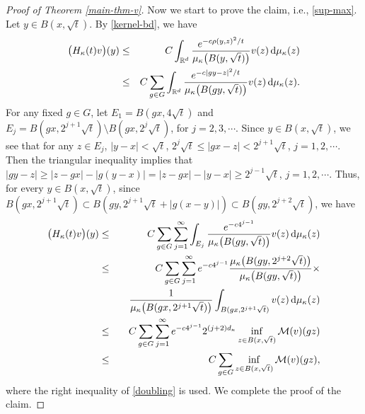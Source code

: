 \documentclass[11pt,a4paper]{article}
\def\R{\mathbb{R}}
\def\d{\textup{d}}
\theoremstyle{definition}\newtheorem{remark}[theorem]{Remark}
\begin{document}
\begin{proof}[Proof of Theorem \ref{main-thm-v}]
Now we start to prove the claim, i.e., \eqref{sup-max}. Let $y\in B(x,\sqrt{t})$. By \eqref{kernel-bd}, we have
\begin{eqnarray*}
\big(H_\kappa(t)v\big)(y)&\leq& C\int_{\R^d}\frac{e^{-c\rho(y,z)^2/t}}{\mu_\kappa\big(B(y,\sqrt{t})\big)}v(z)\,\d\mu_\kappa(z)\\
&\leq& C\sum_{g\in G}\int_{\R^d}\frac{e^{-c|gy-z|^2/t}}{\mu_\kappa\big(B(gy,\sqrt{t})\big)}v(z)\,\d\mu_\kappa(z).
\end{eqnarray*}
For any fixed $g\in G$, let $E_1=B(gx,4\sqrt{t})$ and $E_j=B(gx,2^{j+1}\sqrt{t})\setminus  B(gx,2^j\sqrt{t})$, for $j=2,3,\cdots$. Since $y\in B (x,\sqrt{t})$, we see that for any $z\in E_j$, $|y-x|<\sqrt{t}$, $2^j\sqrt{t}\leq|gx-z|<2^{j+1}\sqrt{t}$, $j=1,2,\cdots$. Then the triangular inequality implies that $|gy-z|\geq|z-gx|-|g(y-x)|=|z-gx|-|y-x|\geq 2^{j-1}\sqrt{t}$, $j=1,2,\cdots$. Thus, for every $y\in B(x,\sqrt{t})$, since $B(gx,2^{j+1}\sqrt{t})\subset B(gy,2^{j+1}\sqrt{t}+|g(x-y)|)\subset B(gy,2^{j+2}\sqrt{t})$, we have
\begin{eqnarray*}
\big(H_\kappa(t)v\big)(y)&\leq& C\sum_{g\in G}\sum_{j=1}^\infty
\int_{E_j}\frac{e^{-c4^{j-1}}}{\mu_\kappa\big(B(gy,\sqrt{t})\big)}v(z)\,\d\mu_\kappa(z)\\
&\leq&C\sum_{g\in G}\sum_{j=1}^\infty e^{-c4^{j-1}}\frac{\mu_\kappa\big(B(gy,2^{j+2}\sqrt{t})\big)}{\mu_\kappa\big(B(gy,\sqrt{t})\big)}\times\\
&&\quad\frac{1}{\mu_\kappa\big(B(gx,2^{j+1}\sqrt{t})\big)}\int_{B(gx,2^{j+1}\sqrt{t})}v(z)\,\d\mu_\kappa(z)\\
&\leq& C\sum_{g\in G}\sum_{j=1}^\infty e^{-c4^{j-1}}  2^{(j+2)d_\kappa}\inf_{z\in B(x,\sqrt{t})}\mathcal{M}(v)(g z)\\
&\leq& C\sum_{g\in G}\inf_{z\in B(x,\sqrt{t})}\mathcal{M}(v)(g z),
\end{eqnarray*}
where the right inequality of \eqref{doubling} is used. We complete the proof of the claim.


\end{proof}
\end{document}
